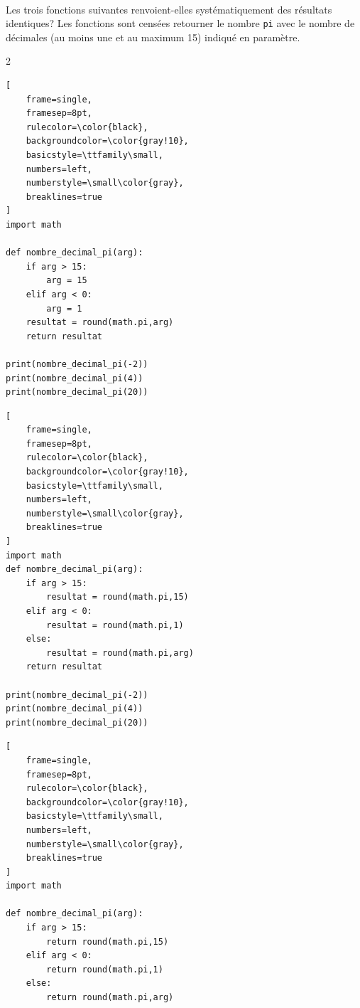 \begin{Exercice}[5 minutes]\\
Les trois fonctions suivantes renvoient-elles systématiquement des résultats identiques? Les fonctions sont censées retourner le nombre \lstinline{pi} avec le nombre de décimales (au moins une et au maximum 15) indiqué en paramètre.
\begin{multicols}{2}
\noindent
\begin{minipage}{0.9\linewidth}
\begin{lstlisting}[
    frame=single,
    framesep=8pt,
    rulecolor=\color{black},
    backgroundcolor=\color{gray!10},
    basicstyle=\ttfamily\small,
    numbers=left,
    numberstyle=\small\color{gray},
    breaklines=true
]
import math

def nombre_decimal_pi(arg):
    if arg > 15:
        arg = 15
    elif arg < 0:
        arg = 1
    resultat = round(math.pi,arg) 
    return resultat

print(nombre_decimal_pi(-2))
print(nombre_decimal_pi(4))
print(nombre_decimal_pi(20))
\end{lstlisting}
\end{minipage}

\columnbreak

\begin{minipage}{1\linewidth}
\begin{lstlisting}[
    frame=single,
    framesep=8pt,
    rulecolor=\color{black},
    backgroundcolor=\color{gray!10},
    basicstyle=\ttfamily\small,
    numbers=left,
    numberstyle=\small\color{gray},
    breaklines=true
]
import math
def nombre_decimal_pi(arg):
    if arg > 15:
        resultat = round(math.pi,15)
    elif arg < 0:
        resultat = round(math.pi,1)
    else: 
        resultat = round(math.pi,arg)
    return resultat

print(nombre_decimal_pi(-2))
print(nombre_decimal_pi(4))
print(nombre_decimal_pi(20))
\end{lstlisting}
\end{minipage}
\end{multicols}


\begin{lstlisting}[
    frame=single,
    framesep=8pt,
    rulecolor=\color{black},
    backgroundcolor=\color{gray!10},
    basicstyle=\ttfamily\small,
    numbers=left,
    numberstyle=\small\color{gray},
    breaklines=true
]
import math

def nombre_decimal_pi(arg):
    if arg > 15:
        return round(math.pi,15)
    elif arg < 0:
        return round(math.pi,1)
    else: 
        return round(math.pi,arg)


\end{lstlisting}
\end{Exercice}
